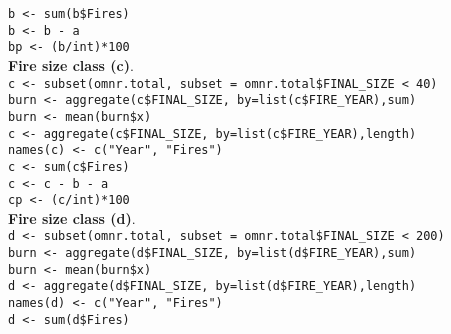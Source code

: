 \begin{spacing}{1.5}
\noindent \texttt{b <- sum(b\$Fires)} \\

\noindent \texttt{b <- b - a} \\

\noindent \texttt{bp <- (b/int)*100} \\

\noindent \textbf{Fire size class (c)}. \\

\noindent \texttt{c <- subset(omnr.total, subset = omnr.total\$FINAL\_SIZE < 40)} \\

\noindent \texttt{burn <- aggregate(c\$FINAL\_SIZE, by=list(c\$FIRE\_YEAR),sum)} \\

\noindent \texttt{burn <- mean(burn\$x)} \\
                     
\noindent \texttt{c <- aggregate(c\$FINAL\_SIZE, by=list(c\$FIRE\_YEAR),length)} \\

\noindent \texttt{names(c) <- c("Year", "Fires")} \\

\noindent \texttt{c <- sum(c\$Fires)} \\

\noindent \texttt{c <- c - b - a} \\

\noindent \texttt{cp <- (c/int)*100} \\

\noindent \textbf{Fire size class (d)}. \\

\noindent \texttt{d <- subset(omnr.total, subset = omnr.total\$FINAL\_SIZE < 200)} \\

\noindent \texttt{burn <- aggregate(d\$FINAL\_SIZE, by=list(d\$FIRE\_YEAR),sum)} \\

\noindent \texttt{burn <- mean(burn\$x)} \\
                     
\noindent \texttt{d <- aggregate(d\$FINAL\_SIZE, by=list(d\$FIRE\_YEAR),length)} \\

\noindent \texttt{names(d) <- c("Year", "Fires")} \\

\noindent \texttt{d <- sum(d\$Fires)} \\


\end{spacing}
